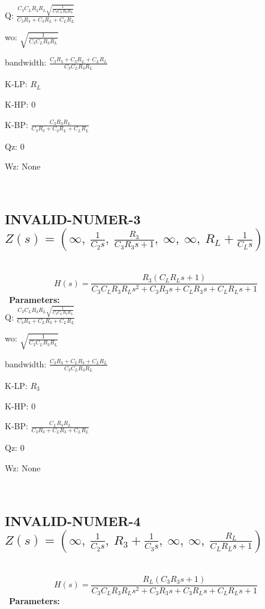 \documentclass{article}
\begin{document}
Q: $\frac{C_{3} C_{L} R_{3} R_{L} \sqrt{\frac{1}{C_{3} C_{L} R_{3} R_{L}}}}{C_{3} R_{3} + C_{3} R_{L} + C_{L} R_{L}}$\ 

wo: $\sqrt{\frac{1}{C_{3} C_{L} R_{3} R_{L}}}$\ 

bandwidth: $\frac{C_{3} R_{3} + C_{3} R_{L} + C_{L} R_{L}}{C_{3} C_{L} R_{3} R_{L}}$\ 

K-LP: $R_{L}$\ 

K-HP: $0$\ 

K-BP: $\frac{C_{3} R_{3} R_{L}}{C_{3} R_{3} + C_{3} R_{L} + C_{L} R_{L}}$\ 

Qz: $0$\ 

Wz: $\text{None}$\ 

\ 

\subsection{INVALID-NUMER-3 $Z(s) = \left( \infty, \  \frac{1}{C_{2} s}, \  \frac{R_{3}}{C_{3} R_{3} s + 1}, \  \infty, \  \infty, \  R_{L} + \frac{1}{C_{L} s}\right)$ } \ 
\textbf{\[H(s) = \frac{R_{3} \left(C_{L} R_{L} s + 1\right)}{C_{3} C_{L} R_{3} R_{L} s^{2} + C_{3} R_{3} s + C_{L} R_{3} s + C_{L} R_{L} s + 1}\] } \ 
\textbf{Parameters:}\\ 

Q: $\frac{C_{3} C_{L} R_{3} R_{L} \sqrt{\frac{1}{C_{3} C_{L} R_{3} R_{L}}}}{C_{3} R_{3} + C_{L} R_{3} + C_{L} R_{L}}$\ 

wo: $\sqrt{\frac{1}{C_{3} C_{L} R_{3} R_{L}}}$\ 

bandwidth: $\frac{C_{3} R_{3} + C_{L} R_{3} + C_{L} R_{L}}{C_{3} C_{L} R_{3} R_{L}}$\ 

K-LP: $R_{3}$\ 

K-HP: $0$\ 

K-BP: $\frac{C_{L} R_{3} R_{L}}{C_{3} R_{3} + C_{L} R_{3} + C_{L} R_{L}}$\ 

Qz: $0$\ 

Wz: $\text{None}$\ 

\ 

\subsection{INVALID-NUMER-4 $Z(s) = \left( \infty, \  \frac{1}{C_{2} s}, \  R_{3} + \frac{1}{C_{3} s}, \  \infty, \  \infty, \  \frac{R_{L}}{C_{L} R_{L} s + 1}\right)$ } \ 
\textbf{\[H(s) = \frac{R_{L} \left(C_{3} R_{3} s + 1\right)}{C_{3} C_{L} R_{3} R_{L} s^{2} + C_{3} R_{3} s + C_{3} R_{L} s + C_{L} R_{L} s + 1}\] } \ 
\textbf{Parameters:}\\ 
\end{document}
